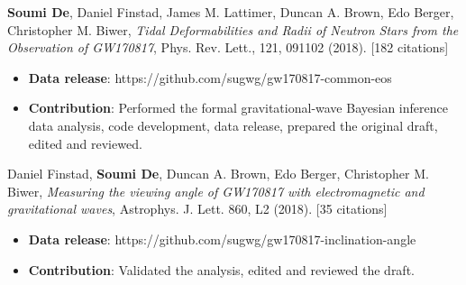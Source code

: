 \begin{etaremune}
\item{\textbf{Soumi De}, Daniel Finstad, James M. Lattimer, Duncan A. Brown, Edo Berger, Christopher M. Biwer, \textit{Tidal Deformabilities and Radii of Neutron Stars from the Observation of GW170817}, Phys. Rev. Lett., 121, 091102 (2018). [182 citations]
\begin{itemize}
\vspace{-2mm}
    \item \textbf{Data release}: https://github.com/sugwg/gw170817-common-eos
    \vspace{-1mm}
    \item \textbf{Contribution}:
    Performed the formal gravitational-wave Bayesian inference data analysis, code development, data release, %
    prepared the original draft, edited and reviewed.
\end{itemize}
}

\item{Daniel Finstad, \textbf{Soumi De}, Duncan A. Brown, Edo Berger, Christopher M. Biwer, \textit{Measuring the viewing angle of GW170817 with electromagnetic and gravitational waves}, Astrophys. J. Lett. 860, L2 (2018). [35 citations]
\begin{itemize}
\vspace{-2mm}
    \item \textbf{Data release}: https://github.com/sugwg/gw170817-inclination-angle
    \vspace{-1mm}
    \item \textbf{Contribution}:
    Validated the analysis, edited and reviewed the draft.
\end{itemize}
}

\end{etaremune}

\iffalse
\subsection{\textbf{Short author - preprints :}}
\vspace{1mm}
\begin{etaremune}
\item{Collin D. Capano, Ingo Tews, Stephanie M. Brown, Ben Margalit, \textbf{Soumi De}, Sumit Kumar, Duncan A. Brown, Badri Krishnan, Sanjay Reddy, \textit{GW170817: Stringent constraints on neutron-star radii from multimessenger observations and nuclear theory}, arXiv:1908.10352 (2019), Submitted to Nature Astronomy.}

\renewcommand{\labelenumi}{\textcolor{gray}{\arabic{enumi}.}}
\item{Michael Forbes, Sukanta Bose, Sanjay Reddy, Dake Zhou, Arunava Mukherjee, \textbf{Soumi De}, \textit{Constraining the neutron-matter equation of state with gravitational waves}, arXiv:1904.04233 (2019), Accepted by Phys. Rev. D.}
\end{etaremune}
\fi

